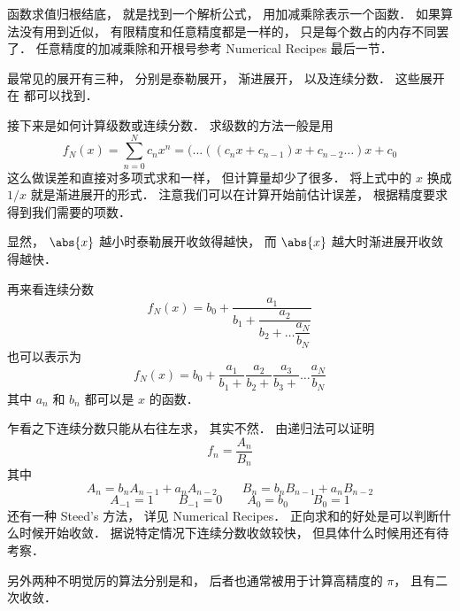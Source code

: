 
函数求值归根结底， 就是找到一个解析公式， 用加减乘除表示一个函数． 如果算法没有用到近似， 有限精度和任意精度都是一样的， 只是每个数占的内存不同罢了． 任意精度的加减乘除和开根号参考 Numerical Recipes 最后一节．

最常见的展开有三种， 分别是泰勒展开， 渐进展开， 以及连续分数． 这些展开在  都可以找到．

接下来是如何计算级数或连续分数． 求级数的方法一般是用
\begin{equation}
f_N(x) = \sum_{n = 0}^N c_n x^n = (\dots ((c_n x + c_{n-1})x + c_{n-2} \dots )x + c_0
\end{equation}
这么做误差和直接对多项式求和一样， 但计算量却少了很多． 将上式中的 $x$ 换成 $1/x$ 就是渐进展开的形式． 注意我们可以在计算开始前估计误差， 根据精度要求得到我们需要的项数．

显然， $\abs{x}$ 越小时泰勒展开收敛得越快， 而 $\abs{x}$ 越大时渐进展开收敛得越快．

再来看连续分数
\begin{equation}
f_N(x) = b_0 + \dfrac{a_1}{b_1 + \dfrac{a_2}{b_2 + \dots \dfrac{a_N}{b_N}}}
\end{equation}
也可以表示为
\begin{equation}
f_N(x) = b_0 + \frac{a_1}{b_1 +} \frac{a_2}{b_2 +} \frac{a_3}{b_3 +} \dots \frac{a_N}{b_N}
\end{equation}
其中 $a_n$ 和 $b_n$ 都可以是 $x$ 的函数．

乍看之下连续分数只能从右往左求， 其实不然． 由递归法可以证明
\begin{equation}
f_n = \frac{A_n}{B_n}
\end{equation}
其中
\begin{equation}
A_n = b_n A_{n-1} + a_n A_{n-2} \qquad
B_n = b_n B_{n-1} + a_n B_{n-2}
\end{equation}
\begin{equation}
A_{-1} = 1 \qquad B_{-1} = 0
\qquad A_0 = b_0 \qquad B_0 = 1
\end{equation}
还有一种 Steed's 方法， 详见 Numerical Recipes． 正向求和的好处是可以判断什么时候开始收敛．
据说特定情况下连续分数收敛较快， 但具体什么时候用还有待考察．

另外两种不明觉厉的算法分别是和， 后者也通常被用于计算高精度的 $\pi$， 且有二次收敛．
